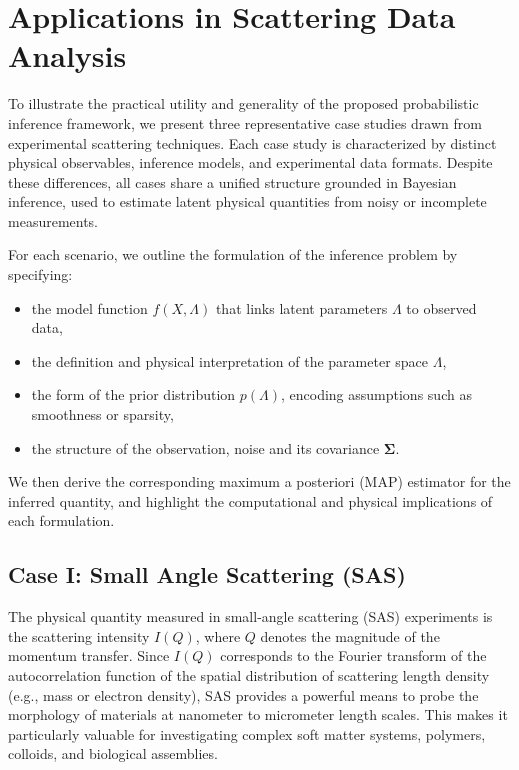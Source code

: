 \documentclass[12pt]{article}
\begin{document}
\section{Applications in Scattering Data Analysis}

To illustrate the practical utility and generality of the proposed probabilistic inference framework, we present three representative case studies drawn from experimental scattering techniques. Each case study is characterized by distinct physical observables, inference models, and experimental data formats. Despite these differences, all cases share a unified structure grounded in Bayesian inference, used to estimate latent physical quantities from noisy or incomplete measurements.

For each scenario, we outline the formulation of the inference problem by specifying:
\begin{itemize}
    \item the model function \( f(X, \Lambda) \) that links latent parameters \( \Lambda \) to observed data,
    \item the definition and physical interpretation of the parameter space \( \Lambda \),
    \item the form of the prior distribution \( p(\Lambda) \), encoding assumptions such as smoothness or sparsity,
    \item the structure of the observation, noise and its covariance \( \boldsymbol{\Sigma} \).
\end{itemize}

We then derive the corresponding maximum a posteriori (MAP) estimator for the inferred quantity, and highlight the computational and physical implications of each formulation.

\subsection{Case I: Small Angle Scattering (SAS)}

The physical quantity measured in small-angle scattering (SAS) experiments is the scattering intensity \( I(Q) \), where \( Q \) denotes the magnitude of the momentum transfer. Since \( I(Q) \) corresponds to the Fourier transform of the autocorrelation function of the spatial distribution of scattering length density (e.g., mass or electron density), SAS provides a powerful means to probe the morphology of materials at nanometer to micrometer length scales. This makes it particularly valuable for investigating complex soft matter systems, polymers, colloids, and biological assemblies.
\end{document}

